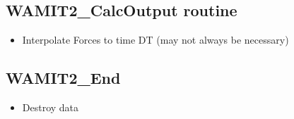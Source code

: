 \subsection{WAMIT2\_CalcOutput routine}
\begin{itemize}
   \item{Interpolate Forces to time DT (may not always be necessary)}
\end{itemize}

\subsection{WAMIT2\_End}
\begin{itemize}
   \item{Destroy data}
\end{itemize}


